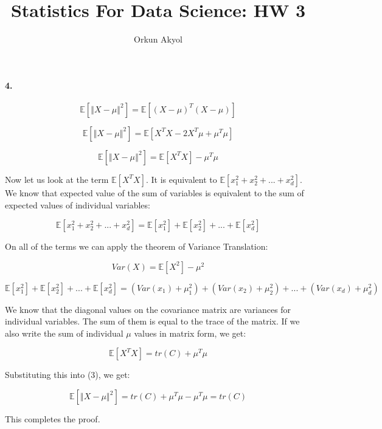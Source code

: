 \documentclass[10pt,letterpaper]{article}
\author{Orkun Akyol}
\title{Statistics For Data Science: HW 3}
\begin{document}
\paragraph{4.}

    \begin{equation}
        \mathbb{E}[\left \Vert X-\mu \right \Vert ^2] = 
        \mathbb{E}[(X-\mu)^T(X-\mu)]
    \end{equation}
    
    \begin{equation}
       \mathbb{E}[\left \Vert X-\mu \right \Vert ^2] = 
       \mathbb{E}[X^TX - 2X^T\mu + \mu^T\mu]
    \end{equation}

    \begin{equation}
       \mathbb{E}[\left \Vert X-\mu \right \Vert ^2] = 
       \mathbb{E}[X^TX] - \mu^T\mu
    \end{equation}

Now let us look at the term $\mathbb{E}[X^TX]$. It is equivalent to $\mathbb{E}[x_1^2 + x_2^2 + ... + x_d^2]$. We know that expected value of the sum of variables is equivalent to the sum of expected values of individual variables: 

    \begin{equation}
       \mathbb{E}[x_1^2 + x_2^2 + ... + x_d^2] = 
       \mathbb{E}[x_1^2] + \mathbb{E}[x_2^2] + ... + \mathbb{E}[x_d^2]
    \end{equation}

On all of the terms we can apply the theorem of Variance Translation: 

    \begin{equation}
       Var(X) =  \mathbb{E}[X^2] - \mu^2
    \end{equation}

    \begin{equation}
       \mathbb{E}[x_1^2] + \mathbb{E}[x_2^2] + ... + \mathbb{E}[x_d^2] = (Var(x_1) + \mu_1^2) + (Var(x_2) + \mu_2^2) + ... + (Var(x_d) + \mu_d^2)
    \end{equation}

We know that the diagonal values on the covariance matrix are variances for individual variables. The sum of them is equal to the trace of the matrix. If we also write the sum of individual $\mu$ values in matrix form, we get: 

    \begin{equation}
       \mathbb{E}[X^TX] = tr(C) + \mu^T\mu
    \end{equation}

Substituting this into (3), we get:

    \begin{equation}
       \mathbb{E}[\left \Vert X-\mu \right \Vert ^2] = 
       tr(C) + \mu^T\mu- \mu^T\mu = tr(C)
    \end{equation}

This completes the proof. 
\end{document}
